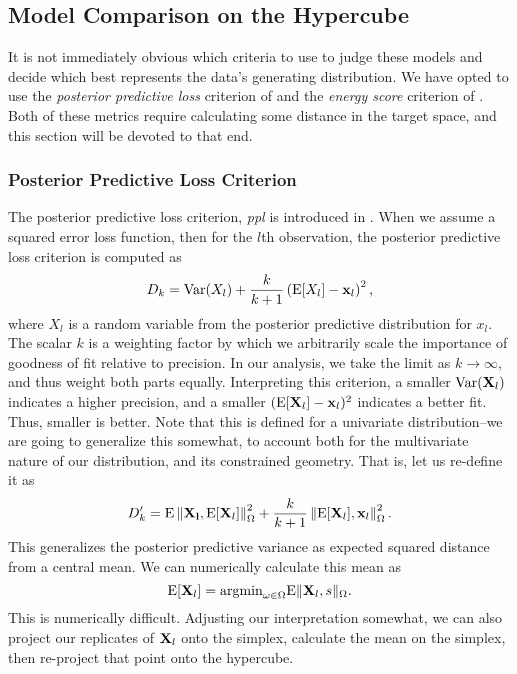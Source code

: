 \subsection{Model Comparison on the Hypercube}
It is not immediately obvious which criteria to use to judge these models and decide which best
  represents the data's generating distribution.  We have opted to use the
  \emph{posterior predictive loss} criterion of \cite{gelfand1998} and the
  \emph{energy score} criterion of \cite{gneiting2007}.  Both of these
  metrics require calculating some distance in the target space, and this section will be devoted
  to that end.

\subsubsection{Posterior Predictive Loss Criterion}
The posterior predictive loss criterion, \emph{ppl} is introduced in \cite{gelfand1998}.  When we assume a
  squared error loss function, then for the $l$th observation, the posterior predictive loss criterion
  is computed as
  \begin{equation}
    \label{eq:ppl}
    D_k = \text{Var}(X_l) + \frac{k}{k + 1}\left(\text{E}[X_l] - {\bf x}_l\right)^2,
  \end{equation}
  where $X_l$ is a random variable from the posterior predictive distribution for $x_l$.  The
  scalar $k$ is a weighting factor by which we arbitrarily scale the importance of goodness of fit
  relative to precision.  In our analysis, we take the limit as $k\to\infty$, and thus weight both
  parts equally.  Interpreting this criterion, a smaller $\text{Var}({\bf X}_l)$ indicates a higher
  precision, and a smaller $(\text{E}[{\bf X}_l] - {\bf x}_l)^2$  indicates a better fit.  Thus,
  smaller is better.  Note that this is defined for a univariate distribution--we are going to
  generalize this somewhat, to account both for the multivariate nature of our distribution, and
  its constrained geometry.  That is, let us re-define it as
  \begin{equation}
    \label{eq:ppl2}
    D_k^{\prime} = \text{E}\left\lVert{\bf X_l},\text{E}[{\bf X}_l]\right\rVert_{\Omega}^2 +
                    \frac{k}{k+1}\left\lVert\text{E}[{\bf X}_l],{\bf x}_l\right\rVert_{\Omega}^2.
  \end{equation}
  This generalizes the posterior predictive variance as expected squared distance from a central
  mean.  We can numerically calculate this mean as 
  \begin{equation*}
    \text{E}[{\bf X}_l] = \text{argmin}_{\omega \in \Omega}\text{E}\lVert {\bf X}_l, s \rVert_{\Omega}.
  \end{equation*}
  This is numerically difficult. Adjusting our interpretation somewhat, we can also project our
  replicates of ${\bf X}_l$ onto the simplex, calculate the mean on the simplex, then re-project
  that point onto the hypercube.

